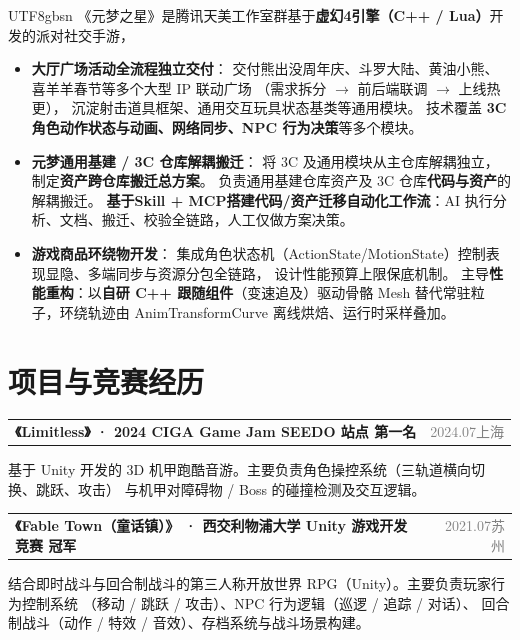 \documentclass[a4paper, 10.5pt]{article}
\makeatletter
\newcommand{\entryheadsingle}[2]{%
  \noindent
  \begin{tabularx}{\linewidth}{@{}X r@{}}
    \textbf{#1} & \small\textcolor{gray}{#2}
  \end{tabularx}\vspace{1pt}}
\makeatother
\begin{document}
\begin{CJK}{UTF8}{gbsn}
\small
《元梦之星》是腾讯天美工作室群基于\textbf{虚幻4引擎（C++ / Lua）}开发的派对社交手游，

\begin{itemize}
  \item \textbf{大厅广场活动全流程独立交付}：
        交付熊出没周年庆、斗罗大陆、黄油小熊、喜羊羊春节等多个大型 IP 联动广场
        （需求拆分 $\rightarrow$ 前后端联调 $\rightarrow$ 上线热更），
        沉淀射击道具框架、通用交互玩具状态基类等通用模块。
        技术覆盖 \textbf{3C 角色动作状态与动画、网络同步、NPC 行为决策}等多个模块。

  \item \textbf{元梦通用基建 / 3C 仓库解耦搬迁}：
        将 3C 及通用模块从主仓库解耦独立，制定\textbf{资产跨仓库搬迁总方案}。
        负责通用基建仓库资产及 3C 仓库\textbf{代码与资产}的解耦搬迁。
        \textbf{基于Skill + MCP搭建代码/资产迁移自动化工作流}：AI 执行分析、文档、搬迁、校验全链路，人工仅做方案决策。

  \item \textbf{游戏商品环绕物开发}：
        集成角色状态机（ActionState/MotionState）控制表现显隐、多端同步与资源分包全链路，
        设计性能预算上限保底机制。
        主导\textbf{性能重构}：以\textbf{自研 C++ 跟随组件}（变速追及）驱动骨骼 Mesh
        替代常驻粒子，环绕轨迹由 AnimTransformCurve 离线烘焙、运行时采样叠加。
\end{itemize}

\section{项目与竞赛经历}

\entryheadsingle{《Limitless》 · 2024 CIGA Game Jam SEEDO 站点 \textbf{第一名}}{2024.07\quad 上海}

\small
基于 Unity 开发的 3D 机甲跑酷音游。主要负责角色操控系统（三轨道横向切换、跳跃、攻击）
与机甲对障碍物 / Boss 的碰撞检测及交互逻辑。

\vspace{5pt}

\entryheadsingle{《Fable Town（童话镇）》 · 西交利物浦大学 Unity 游戏开发竞赛 \textbf{冠军}}{2021.07\quad 苏州}

\small
结合即时战斗与回合制战斗的第三人称开放世界 RPG（Unity）。主要负责玩家行为控制系统
（移动 / 跳跃 / 攻击）、NPC 行为逻辑（巡逻 / 追踪 / 对话）、
回合制战斗（动作 / 特效 / 音效）、存档系统与战斗场景构建。

\vspace{5pt}


\end{CJK}
\end{document}
